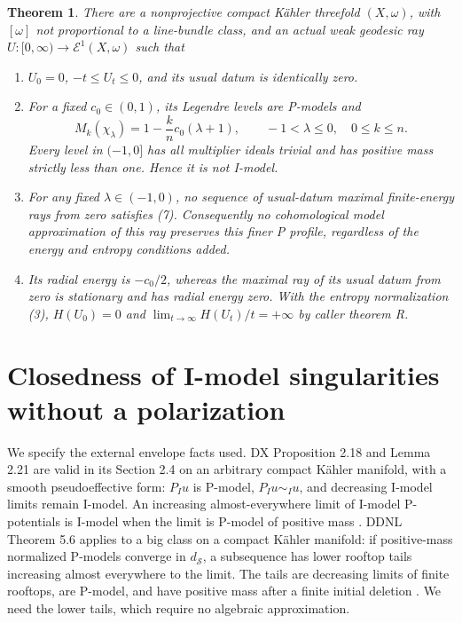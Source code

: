 \documentclass[11pt]{article}
\newtheorem{theorem}{Theorem}
\newcommand{\ds}{d_{\mathcal S}}
\newcommand{\Eone}{\mathcal E^1}
\begin{document}
\begin{theorem}\label{main}
There are a nonprojective compact K\"ahler threefold $(X,\omega)$,
with $[\omega]$ not proportional to a line-bundle class, and an actual
weak geodesic ray $U:[0,\infty)\to\Eone(X,\omega)$ such that
\begin{enumerate}
\item $U_0=0$, $-t\le U_t\le0$, and its usual datum is identically zero.
\item For a fixed $c_0\in(0,1)$, its Legendre levels are P-models and
\[
 M_k(\chi_\lambda)=1-\frac{k}{n}c_0(\lambda+1),
       \qquad -1<\lambda\le0,
       \quad 0\le k\le n.                                 \tag{8}
\]
Every level in $(-1,0]$ has all multiplier ideals trivial and has
positive mass strictly less than one. Hence it is not I-model.
\item For any fixed $\lambda\in(-1,0)$, no sequence of usual-datum
maximal finite-energy rays from zero satisfies (7). Consequently no
cohomological model approximation of this ray preserves this finer
P profile, regardless of the energy and entropy conditions added.
\item Its radial energy is $-c_0/2$, whereas the maximal ray of its
usual datum from zero is stationary and has radial energy zero.
With the entropy normalization (3), $H(U_0)=0$ and
$\lim_{t\to\infty}H(U_t)/t=+\infty$ by caller theorem R.
\end{enumerate}
\end{theorem}

\section{Closedness of I-model singularities without a polarization}
We specify the external envelope facts used. DX Proposition 2.18 and
Lemma 2.21 are valid in its Section 2.4 on an arbitrary compact
K\"ahler manifold, with a smooth pseudoeffective form: $P_Iu$ is
P-model, $P_Iu\sim_Iu$, and decreasing I-model limits remain I-model.
An increasing almost-everywhere limit of I-model P-potentials is
I-model when the limit is P-model of positive mass \cite{DX}.
DDNL Theorem 5.6 applies to a big class on a compact K\"ahler
manifold: if positive-mass normalized P-models converge in $\ds$,
a subsequence has lower rooftop tails increasing almost everywhere
to the limit. The tails are decreasing limits of finite rooftops,
are P-model, and have positive mass after a finite initial deletion
\cite{DDNL}. We need the lower tails, which require no algebraic
approximation.
\end{document}

